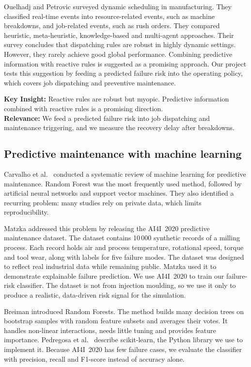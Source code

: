 \documentclass[11pt,a4paper]{article}
\begin{document}
Ouelhadj and Petrovic \cite{ouelhadj2009} surveyed dynamic scheduling in manufacturing. They classified real-time events into resource-related events, such as machine breakdowns, and job-related events, such as rush orders. They compared heuristic, meta-heuristic, knowledge-based and multi-agent approaches. Their survey concludes that dispatching rules are robust in highly dynamic settings. However, they rarely achieve good global performance. Combining predictive information with reactive rules is suggested as a promising approach. Our project tests this suggestion by feeding a predicted failure risk into the operating policy, which covers job dispatching and preventive maintenance.

\textbf{Key Insight:} Reactive rules are robust but myopic. Predictive information combined with reactive rules is a promising direction.\\
\textbf{Relevance:} We feed a predicted failure risk into job dispatching and maintenance triggering, and we measure the recovery delay after breakdowns.

\subsection{Predictive maintenance with machine learning}
Carvalho et al.\ \cite{carvalho2019} conducted a systematic review of machine learning for predictive maintenance. Random Forest was the most frequently used method, followed by artificial neural networks and support vector machines. They also identified a recurring problem: many studies rely on private data, which limits reproducibility.

Matzka \cite{matzka2020} addressed this problem by releasing the AI4I~2020 predictive maintenance dataset. The dataset contains 10\,000 synthetic records of a milling process. Each record holds air and process temperature, rotational speed, torque and tool wear, along with labels for five failure modes. The dataset was designed to reflect real industrial data while remaining public. Matzka used it to demonstrate explainable failure prediction. We use AI4I~2020 to train our failure-risk classifier. The dataset is not from injection moulding, so we use it only to produce a realistic, data-driven risk signal for the simulation.

Breiman \cite{breiman2001} introduced Random Forests. The method builds many decision trees on bootstrap samples with random feature subsets and averages their votes. It handles non-linear interactions, needs little tuning and provides feature importance. Pedregosa et al.\ \cite{pedregosa2011} describe scikit-learn, the Python library we use to implement it. Because AI4I~2020 has few failure cases, we evaluate the classifier with precision, recall and F1-score instead of accuracy alone.
\end{document}
